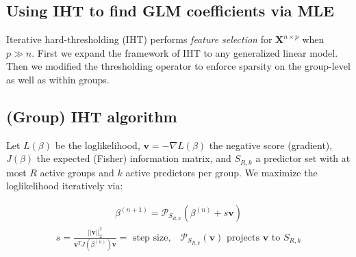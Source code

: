 \documentclass[a0,portrait]{a0poster}
\begin{document}
\begin{multicols}{2}

\color{Navy} 
\section*{Using IHT to find GLM coefficients via MLE}

\color{Black}

Iterative hard-thresholding (IHT) performs \textit{feature selection} for $\mathbf{X}^{n \times p}$ when $p \gg n$. First we expand the framework of IHT to any generalized linear model. Then we modified the thresholding operator to enforce sparsity on the group-level as well as within groups. 

\subsection*{(Group) IHT algorithm}

 Let $L(\beta)$ be the loglikelihood, $\mathbf{v} = -\nabla L(\beta)$ the negative score (gradient), $J(\beta)$ the expected (Fisher) information matrix, and $S_{R, k}$ a predictor set with at most $R$ active groups and $k$ active predictors per group. We maximize the loglikelihood iteratively via:

\begin{align*}
	\beta^{(n+1)} = \mathcal{P}_{S_{R, k}}\left( \beta^{(n)} + s\mathbf{v} \right)
\end{align*}
\begin{align*}
	s = \frac{||\mathbf{v}||^2_2}{\mathbf{v}^TJ(\beta^{(n)})\mathbf{v}} = \text{ step size,} \quad \mathcal{P}_{S_{R, k}}(\mathbf{v}) \text{ projects } \mathbf{v} \text{ to } S_{R, k}
\end{align*}

\vspace{1cm}

%
%    


\end{multicols}
\end{document}
